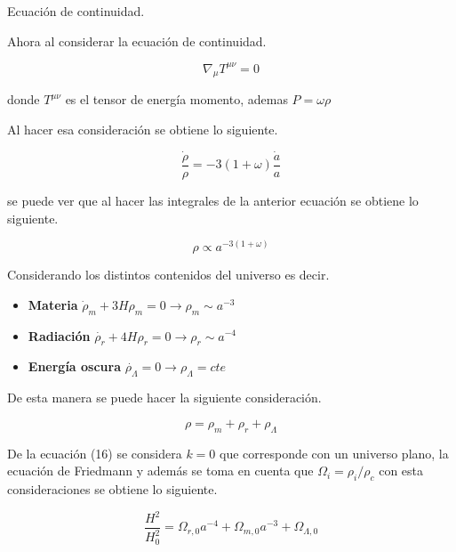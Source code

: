 \documentclass[10pt]{beamer}
\begin{document}
\begin{frame}{Ecuación de continuidad.}

Ahora al considerar la ecuación de continuidad.

\begin{equation}
\nabla_\mu T^{\mu\nu} = 0
\end{equation}

donde $T^{\mu\nu}$ es el tensor de energía momento, ademas $P = \omega\rho$

Al hacer esa consideración se obtiene lo siguiente.

\begin{equation}
\frac{\dot{\rho}}{\rho} = -3(1+\omega)\frac{\dot{a}}{a}
\end{equation}

se puede ver que al hacer las integrales de la anterior ecuación se obtiene lo siguiente.

\begin{equation}
\rho \varpropto a^{-3(1+\omega)}
\end{equation}

\end{frame}

\begin{frame}
Considerando los distintos contenidos del universo es decir.

\begin{itemize}
\item \textbf{Materia} $\dot{\rho}_m + 3H\rho_m = 0\rightarrow \rho_m\sim a^{-3}$
\item \textbf{Radiación} $\dot{\rho_r} + 4H\rho_r = 0 \rightarrow \rho_r\sim a^{-4}$
\item \textbf{Energía oscura} $\dot{\rho_\Lambda} = 0\rightarrow \rho_\Lambda = cte$
\end{itemize}

De esta manera se puede hacer la siguiente consideración.

\begin{equation}
\rho = \rho_m+\rho_r+\rho_\Lambda
\end{equation}

De la ecuación (16) se considera $k=0$ que corresponde con un universo plano, la ecuación de Friedmann y además  se toma en cuenta que $\Omega_i = \rho_i/\rho_c$ con esta consideraciones se obtiene lo siguiente.

\begin{equation}
\frac{H^2}{H_0^2} = \Omega_{r,0}a^{-4}+\Omega_{m,0}a^{-3} + \Omega_{\Lambda,0}
\end{equation}
\end{frame}
\end{document}
